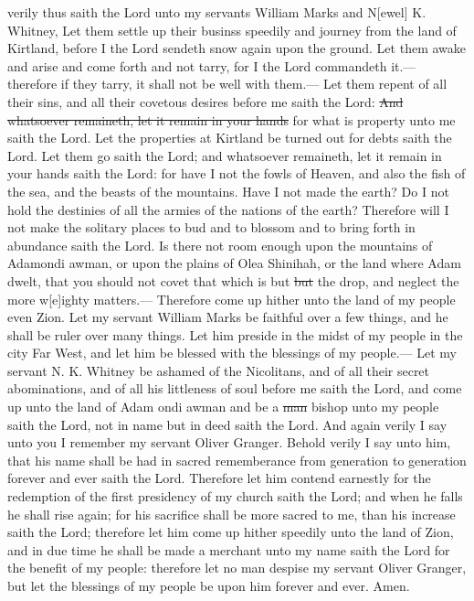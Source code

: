 					verily thus saith the Lord unto my servants William Marks and N[ewel] K. Whitney, Let them settle up their businss speedily and journey from the land of Kirtland, before I the Lord sendeth snow again upon the ground. Let them awake and arise and come forth and not tarry, for I the Lord commandeth it.--- therefore if they tarry, it shall not be well with them.--- Let them repent of all their sins, and all their covetous desires before me saith the Lord: \sout{And whatsoever remaineth, let it remain in your hands} for what is property unto me saith the Lord. Let the properties at Kirtland be turned out for debts saith the Lord. Let them go saith the Lord; and whatsoever remaineth, let it remain in your hands saith the Lord: for have I not the fowls of Heaven, and also the fish of the sea, and the beasts of the mountains. Have I not made the earth? Do I not hold the destinies of all the armies of the nations of the earth? Therefore will I not make the solitary places to bud and to blossom and to bring forth in abundance saith the Lord. Is there not room enough upon the mountains of Adamondi awman, or upon the plains of Olea Shinihah, or the land where Adam dwelt, that you should not covet that which is but \sout{but} the drop, and neglect the more w[e]ighty matters.--- Therefore come up hither unto the land of my people even Zion. Let my servant William Marks be faithful over a few things, and he shall be ruler over many things. Let him preside in the midst of my people in the city Far West, and let him be blessed with the blessings of my people.--- Let my servant N. K. Whitney be ashamed of the Nicolitans, and of all their secret abominations, and of all his littleness of soul before me saith the Lord, and come up unto the land of Adam ondi awman and be a \sout{man} bishop unto my people saith the Lord, not in name but in deed saith the Lord. And again verily I say unto you I remember my servant Oliver Granger. Behold verily I say unto him, that his name shall be had in sacred rememberance from generation to generation forever and ever saith the Lord. Therefore let him contend earnestly for the redemption of the first presidency of my church saith the Lord; and when he falls he shall rise again; for his sacrifice shall be more sacred to me, than his increase saith the Lord; therefore let him come up hither speedily unto the land of Zion, and in due time he shall be made a merchant unto my name saith the Lord for the benefit of my people: therefore let no man despise my servant Oliver Granger, but let the blessings of my people be upon him forever and ever. Amen.


